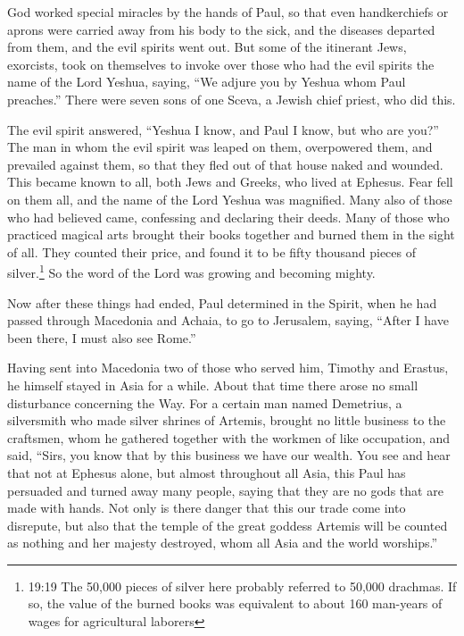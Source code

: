 \myverse{}God worked special miracles by the hands of Paul,
\myverse{}so that even handkerchiefs or aprons were carried away from his body to the
sick, and the diseases departed from them, and the evil spirits went out.
\myverse{}But some of the itinerant Jews, exorcists, took on themselves to invoke over
those who had the evil spirits the name of the Lord Yeshua, saying, “We adjure you by Yeshua whom Paul
preaches.”
\myverse{}There were seven sons of one Sceva, a Jewish chief priest, who did this.

\myverse{}The evil spirit answered, “Yeshua I know, and Paul I know, but
who are you?”
\myverse{}The man in whom the evil spirit was leaped on them, overpowered them, and
prevailed against them, so that they fled out of that house naked and wounded.
\myverse{}This became known to all, both Jews and Greeks, who lived at Ephesus. Fear
fell on them all, and the name of the Lord Yeshua was magnified.
\myverse{}Many also of those who had believed came, confessing and declaring their
deeds.
\myverse{}Many of those who practiced magical arts brought their books together and
burned them in the sight of all. They counted their price, and found it to be fifty thousand pieces of
silver.\footnote{19:19 The 50,000 pieces of silver here probably referred to 50,000 drachmas. If so, the value of the
	burned books was equivalent to about 160 man-years of wages for agricultural laborers}
\myverse{}So the word of the Lord was growing and becoming mighty.

\myverse{}Now after these things had ended, Paul determined in the Spirit,
when he had passed through Macedonia and Achaia, to go to Jerusalem, saying, “After I have been there,
I must also see Rome.”

\myverse{}Having sent into Macedonia two of those who served him, Timothy
and Erastus, he himself stayed in Asia for a while.
\myverse{}About that time there arose no small disturbance concerning the Way.
\myverse{}For a certain man named Demetrius, a silversmith who made silver shrines
of Artemis, brought no little business to the craftsmen,
\myverse{}whom he gathered together with the workmen of like occupation, and said,
“Sirs, you know that by this business we have our wealth.
\myverse{}You see and hear that not at Ephesus alone, but almost throughout all Asia,
this Paul has persuaded and turned away many people, saying that they are no gods that are made with hands.
\myverse{}Not only is there danger that this our trade come into disrepute, but also
that the temple of the great goddess Artemis will be counted as nothing and her majesty destroyed, whom
all Asia and the world worships.”

